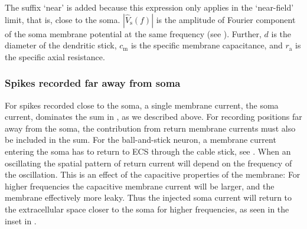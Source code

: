The suffix `near' is added because this expression only applies in the `near-field' limit, that is, close to the soma.
$|\hat{V}_\mathrm{s}(f)|$ is the amplitude of Fourier component of the soma membrane potential at the same
frequency (see ). Further, $d$ is the diameter of the dendritic
stick, $c_\mathrm{m}$ is the specific membrane capacitance, and $r_\mathrm{a}$ is the specific axial resistance.  



\subsubsection{Spikes recorded far away from soma}
\label{sec:Spikes:far-spikes}
For spikes recorded close to the soma, a single membrane current, the soma current, dominates the sum in 
, as we described above. For recording positions far away from the soma, the contribution from return membrane currents must also be included in the sum. For the ball-and-stick neuron, a membrane current entering the soma has to return to ECS through the cable stick, see . When an oscillating
 the spatial pattern of return current will depend on the frequency of the oscillation.
This is an effect of the capacitive properties of the membrane: For higher frequencies the capacitive membrane current will be larger, and the membrane effectively more leaky. Thus the injected soma current will return to the extracellular space closer to the soma for higher frequencies, as  seen in the inset in .  

